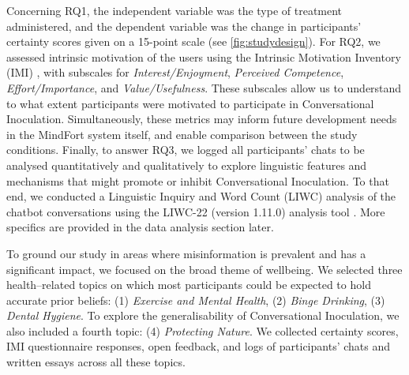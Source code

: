 \documentclass[sigconf]{acmart}
\begin{document}
Concerning RQ1, the independent variable was the type of treatment administered, and the dependent variable was the change in participants’ certainty scores given on a 15-point scale (see \autoref{fig:studydesign}).
For RQ2, we assessed intrinsic motivation of the users using the Intrinsic Motivation Inventory (IMI) \cite{ryan1982control}, with subscales for \textit{Interest/Enjoyment}, \textit{Perceived Competence}, \textit{Effort/Importance}, and \textit{Value/Usefulness}. 
These subscales allow us to understand to what extent participants were motivated to participate in Conversational Inoculation.
Simultaneously, these metrics may inform future development needs in the MindFort system itself, and enable comparison between the study conditions.
Finally, to answer RQ3, we logged all participants’ chats to be analysed quantitatively and qualitatively to explore linguistic features and mechanisms that might promote or inhibit Conversational Inoculation.
To that end, we conducted a Linguistic Inquiry and Word Count (LIWC) analysis of the chatbot conversations using the LIWC-22 (version 1.11.0) analysis tool \cite{Pennebaker2022}.
More specifics are provided in the data analysis section later.

To ground our study in areas where misinformation is prevalent and has a significant impact, we focused on the broad theme of wellbeing. We selected three health–related topics on which most participants could be expected to hold accurate prior beliefs: (1) \textit{Exercise and Mental Health}, (2) \textit{Binge Drinking}, (3) \textit{Dental Hygiene}. To explore the generalisability of Conversational Inoculation, we also included a fourth topic: (4) \textit{Protecting Nature}.
We collected certainty scores, IMI questionnaire responses, open feedback, and logs of participants' chats and written essays across all these topics.

\end{document}
